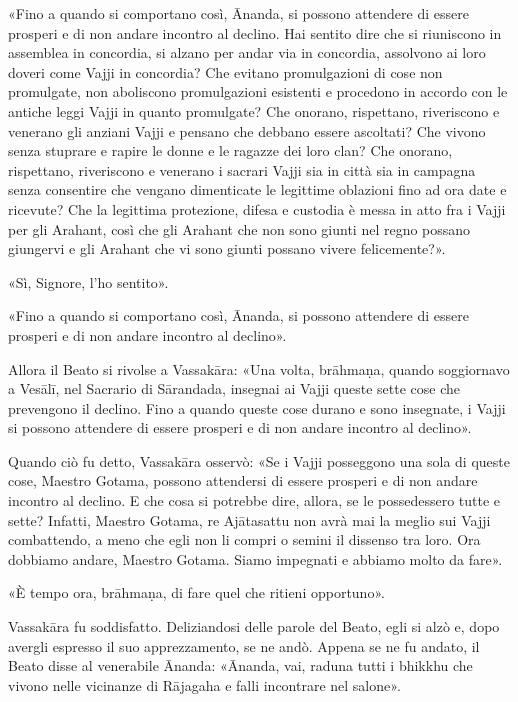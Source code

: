 «Fino a quando si comportano così, Ānanda, si possono attendere di essere
prosperi e di non andare incontro al declino. Hai sentito dire che si riuniscono
in assemblea in concordia, si alzano per andar via in concordia, assolvono ai
loro doveri come Vajji in concordia? Che evitano promulgazioni di cose non
promulgate, non aboliscono promulgazioni esistenti e procedono in accordo con le
antiche leggi Vajji in quanto promulgate? Che onorano, rispettano, riveriscono e
venerano gli anziani Vajji e pensano che debbano essere ascoltati? Che vivono
senza stuprare e rapire le donne e le ragazze dei loro clan? Che onorano,
rispettano, riveriscono e venerano i sacrari Vajji sia in città sia in campagna
senza consentire che vengano dimenticate le legittime oblazioni fino ad ora date
e ricevute? Che la legittima protezione, difesa e custodia è messa in atto fra i
Vajji per gli Arahant, così che gli Arahant che non sono giunti nel regno
possano giungervi e gli Arahant che vi sono giunti possano vivere felicemente?».

«Sì, Signore, l’ho sentito».

«Fino a quando si comportano così, Ānanda, si possono attendere di essere
prosperi e di non andare incontro al declino».

Allora il Beato si rivolse a Vassakāra: «Una volta, brāhmaṇa, quando soggiornavo
a Vesālī, nel Sacrario di Sārandada, insegnai ai Vajji queste sette cose che
prevengono il declino. Fino a quando queste cose durano e sono insegnate, i
Vajji si possono attendere di essere prosperi e di non andare incontro al
declino».

Quando ciò fu detto, Vassakāra osservò: «Se i Vajji posseggono una sola di
queste cose, Maestro Gotama, possono attendersi di essere prosperi e di non
andare incontro al declino. E che cosa si potrebbe dire, allora, se le
possedessero tutte e sette? Infatti, Maestro Gotama, re Ajātasattu non avrà mai
la meglio sui Vajji combattendo, a meno che egli non li compri o semini il
dissenso tra loro. Ora dobbiamo andare, Maestro Gotama. Siamo impegnati e
abbiamo molto da fare».

«È tempo ora, brāhmaṇa, di fare quel che ritieni opportuno».

Vassakāra fu soddisfatto. Deliziandosi delle parole del Beato, egli si alzò e,
dopo avergli espresso il suo apprezzamento, se ne andò. Appena se ne fu andato,
il Beato disse al venerabile Ānanda: «Ānanda, vai, raduna tutti i bhikkhu che
vivono nelle vicinanze di Rājagaha e falli incontrare nel salone».

